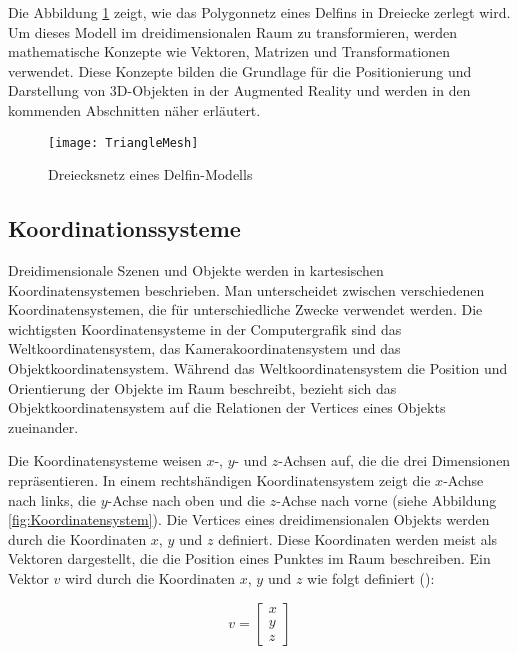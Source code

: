 Die Abbildung \ref{fig:TriangleMesh} zeigt, wie das Polygonnetz eines Delfins in Dreiecke zerlegt wird. Um dieses Modell im dreidimensionalen Raum zu transformieren, werden mathematische Konzepte wie Vektoren, Matrizen und Transformationen verwendet. Diese Konzepte bilden die Grundlage für die Positionierung und Darstellung von 3D-Objekten in der Augmented Reality und werden in den kommenden Abschnitten näher erläutert. \cite{wikipedia2023mesh, espinoza2024graphics}

\begin{figure}
    \centering
    \texttt{[image: TriangleMesh]}
    \caption{Dreiecksnetz eines Delfin-Modells \cite{wikipedia2023mesh}\label{fig:TriangleMesh}}\par
\end{figure}

\subsection{Koordinationssysteme}

Dreidimensionale Szenen und Objekte werden in kartesischen Koordinatensystemen beschrieben. Man unterscheidet zwischen verschiedenen Koordinatensystemen, die für unterschiedliche Zwecke verwendet werden. Die wichtigsten Koordinatensysteme in der Computergrafik sind das Weltkoordinatensystem, das Kamerakoordinatensystem und das Objektkoordinatensystem. Während das Weltkoordinatensystem die Position und Orientierung der Objekte im Raum beschreibt, bezieht sich das Objektkoordinatensystem auf die Relationen der Vertices eines Objekts zueinander. \cite{doerner2022virtual, gao2021vSLAM, usau2023appleARCamera}

Die Koordinatensysteme weisen \(x\)-, \(y\)- und \(z\)-Achsen auf, die die drei Dimensionen repräsentieren. In einem rechtshändigen Koordinatensystem zeigt die \(x\)-Achse nach links, die \(y\)-Achse nach oben und die \(z\)-Achse nach vorne (siehe Abbildung \ref{fig:Koordinatensystem}). Die Vertices eines dreidimensionalen Objekts werden durch die Koordinaten \(x\), \(y\) und \(z\) definiert. Diese Koordinaten werden meist als Vektoren dargestellt, die die Position eines Punktes im Raum beschreiben. Ein Vektor \(v\) wird durch die Koordinaten \(x\), \(y\) und \(z\) wie folgt definiert (\cite{doerner2022virtual, gao2021vSLAM, freescale2010math3d, pezzi2021matrices}):

\begin{equation}
v = \begin{bmatrix} x \\ y \\ z \end{bmatrix}
\end{equation}

